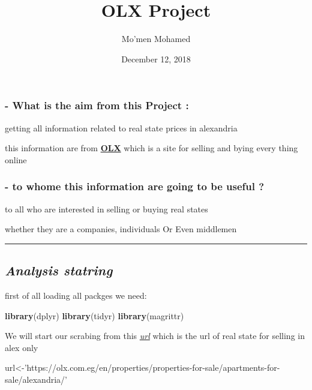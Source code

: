 \documentclass[]{article}
\title{OLX Project}
\author{Mo'men Mohamed}
\date{December 12, 2018}
\newenvironment{Shaded}{\begin{snugshade}}{\end{snugshade}}
\newcommand{\KeywordTok}[1]{\textcolor[rgb]{0.13,0.29,0.53}{\textbf{#1}}}
\newcommand{\StringTok}[1]{\textcolor[rgb]{0.31,0.60,0.02}{#1}}
\newcommand{\NormalTok}[1]{#1}
\begin{document}
\maketitle

\subsubsection{- What is the aim from this Project
:}\label{what-is-the-aim-from-this-project}

getting all information related to real state prices in alexandria

this information are from \href{https://olx.com.eg/en/}{\textbf{OLX}}
which is a site for selling and bying every thing online

\subsubsection{- to whome this information are going to be useful
?}\label{to-whome-this-information-are-going-to-be-useful}

to all who are interested in selling or buying real states

whether they are a companies, individuals Or Even middlemen

\begin{center}\rule{0.5\linewidth}{\linethickness}\end{center}

\subsection{\texorpdfstring{\emph{Analysis
statring}}{Analysis statring}}\label{analysis-statring}

first of all loading all packges we need:

\begin{Shaded}
\begin{Highlighting}[]
\KeywordTok{library}\NormalTok{(dplyr)}
\KeywordTok{library}\NormalTok{(tidyr)}
\KeywordTok{library}\NormalTok{(magrittr)}
\end{Highlighting}
\end{Shaded}

We will start our scrabing from this
\href{https://olx.com.eg/en/properties/properties-for-sale/apartments-for-sale/alexandria/}{\emph{url}}
which is the url of real state for selling in alex only

\begin{Shaded}
\begin{Highlighting}[]
\NormalTok{url<-}\StringTok{'https://olx.com.eg/en/properties/properties-for-sale/apartments-for-sale/alexandria/'}
\end{Highlighting}
\end{Shaded}
\end{document}
